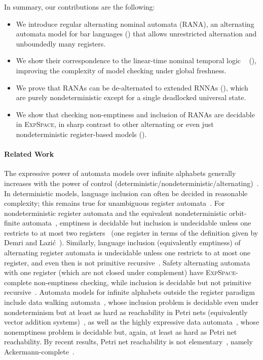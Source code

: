 \documentclass[10pt, final, conference, a4paper, twocolumn]{IEEEtran}
\newcommand{\EXPSPACE}{\textsc{ExpSpace}\xspace}
\begin{document}
In summary, our contributions are the following:
\begin{itemize}
\item We introduce regular alternating nominal automata (RANA), an
  alternating automata model for bar languages () that
  allows unrestricted alternation and unboundedly many registers.%
  \item We show their correspondence to the linear-time nominal
    temporal logic \muBar~\cite{hms21} (),
    improving the complexity of model checking under global freshness.
  \item We prove that RANAs can be %
    de-alternated to extended RNNAs (), which are
    purely nondeterministic except for a single deadlocked universal
    state. %
  \item We show that checking non-emptiness and inclusion of RANAs are decidable in
    \EXPSPACE, in sharp contrast to other alternating or even just nondeterministic
    register-based models ().
\end{itemize}


 
\IEEEpubidadjcol{}
\paragraph*{Related Work}%
The expressive power of automata models over infinite alphabets
generally increases with the power of control
(deterministic/nondeterministic/alternating)~\cite{KlinEA21}. In
deterministic models, language inclusion can often be decided in
reasonable complexity; this remains true for unambiguous register
automata~\cite{MottetQuaas19,Colcombet15,bfkm24}. For nondeterministic
register automata and the equivalent nondeterministic orbit-finite
automata~\cite{BojanczykEA14}, emptiness is decidable but inclusion is
undecidable unless one restricts to at most two
registers~\cite{KaminskiFrancez94} (one register in terms of the definition
given by Demri and Lazi{\'c}~\cite{DemriLazic09}). Similarly, language inclusion
(equivalently emptiness) of alternating register automata is
undecidable unless one restricts to at most one register, and even
then is not primitive recursive~\cite{DemriLazic09}. Safety
alternating automata with one register (which are not closed under
complement) have \EXPSPACE-complete non-emptiness checking,
while inclusion is decidable but not primitive
recursive~\cite{Lazic11}. Automata models for infinite alphabets outside
the register paradigm include data walking automata~\cite{ManuelEA16},
whose inclusion problem is decidable even under nondeterminism but at
least as hard as reachability in Petri nets (equivalently vector
addition systems)~\cite{ColcombetManuel15}, as well as the highly
expressive data automata~\cite{BojanczykEA11}, whose nonemptiness
problem is decidable but, again, at least as hard as Petri net
reachability. By recent results, Petri net reachability is
not elementary~\cite{CzerwinskiEA21}, namely
Ackermann-complete~\cite{LerouxSchmitz19,Leroux22,CzerwinskiOrlikowski22}.
\end{document}
